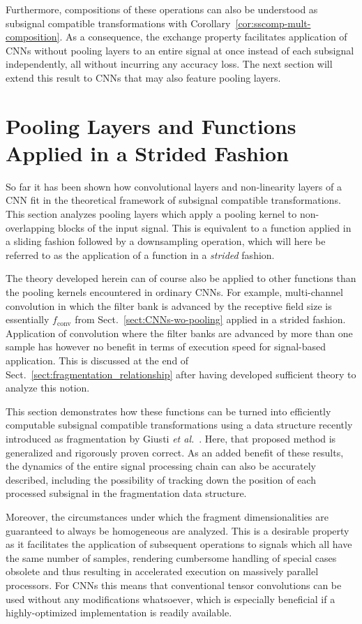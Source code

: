 \documentclass[journal]{IEEEtran}
\DeclareMathOperator{\convop}{conv}
\begin{document}
Furthermore, compositions of these operations can also be understood as subsignal compatible transformations with Corollary~\ref{cor:sscomp-mult-composition}.
As a consequence, the exchange property facilitates application of CNNs without pooling layers to an entire signal at once instead of each subsignal independently, all without incurring any accuracy loss.
The next section will extend this result to CNNs that may also feature pooling layers.

\section{Pooling Layers and Functions Applied in a Strided Fashion}
\label{sect:strided_functions}
So far it has been shown how convolutional layers and non-linearity layers of a CNN fit in the theoretical framework of subsignal compatible transformations.
This section analyzes pooling layers which apply a pooling kernel to non-overlapping blocks of the input signal.
This is equivalent to a function applied in a sliding fashion followed by a downsampling operation, which will here be referred to as the application of a function in a \emph{strided} fashion.

The theory developed herein can of course also be applied to other functions than the pooling kernels encountered in ordinary CNNs.
For example, multi-channel convolution in which the filter bank is advanced by the receptive field size is essentially $f_{\convop}$ from Sect.~\ref{sect:CNNs-wo-pooling} applied in a strided fashion.
Application of convolution where the filter banks are advanced by more than one sample has however no benefit in terms of execution speed for signal-based application.
This is discussed at the end of Sect.~\ref{sect:fragmentation_relationship} after having developed sufficient theory to analyze this notion.

This section demonstrates how these functions can be turned into efficiently computable subsignal compatible transformations using a data structure recently introduced as fragmentation by Giusti \emph{et al.}~\cite{Giusti2013}.
Here, that proposed method is generalized and rigorously proven correct.
As an added benefit of these results, the dynamics of the entire signal processing chain can also be accurately described, including the possibility of tracking down the position of each processed subsignal in the fragmentation data structure.

Moreover, the circumstances under which the fragment dimensionalities are guaranteed to always be homogeneous are analyzed.
This is a desirable property as it facilitates the application of subsequent operations to signals which all have the same number of samples, rendering cumbersome handling of special cases obsolete and thus resulting in accelerated execution on massively parallel processors.
For CNNs this means that conventional tensor convolutions can be used without any modifications whatsoever, which is especially beneficial if a highly-optimized implementation is readily available.
\end{document}
